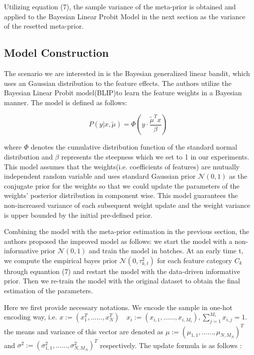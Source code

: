 \documentclass{article}
\begin{document}
Utilizing equation (7), the sample variance of the meta-prior is obtained and applied to the Bayesian Linear Probit Model in the next section as the variance of the resetted meta-prior.

\subsection{Model Construction}
The scenario we are interested in is the Bayesian generalized linear bandit, which uses an Gaussian distribution to the feature effects. The authors utilize the Bayesian Linear Probit model(BLIP)to learn the feature weights in a Bayesian manner. The model is defined as follows:

\begin{equation}
  P(y | x, \tilde{\mu} ) = \Phi (y \cdot \frac{\tilde{\mu}^T x}{\beta})
\end{equation}

where $\Phi$ denotes the cumulative distribution function of the standard normal distribution and $\beta$ represents the steepness which we set to 1 in our experiments. This model assumes that the weights(i.e. coefficients of features) are mutually independent random variable and uses standard Gaussian prior $\mathcal{N}(0,1)$ as the conjugate prior for the weights so that we could update the parameters of the weights' posterior distribution in component wise. This model guarantees the non-increased variance of each subsequent weight update and the weight variance is upper bounded by the initial pre-defined prior.

Combining the model with the meta-prior estimation in the previous section, the authors proposed the improved model as follows: we start the model with a non-informative prior $\mathcal{N}(0,1)$ and train the model in batches. At an early time t, we compute the empirical bayes prior $\mathcal{N}(0,\tau_{k,t}^2)$ for each feature category $C_k$ through equantion (7) and restart the model with the data-driven informative prior. Then we re-train the model with the original dataset to obtain the final estimation of the parameters.

Here we first provide necessary notations. We encode the sample in one-hot encoding way, i.e. $x := (x_1^T,......,x_N^T) \quad x_i := (x_{i,1},......,x_{i,M_i}), \sum_{j=1}^{M_i} x_{i,j} = 1$. the means and variance of this vector are denoted as ${\mu} := (\mu_{1,1},......,\mu_{N,M_N})^T$ and $\sigma^2 := (\sigma_{1,1}^2,......,\sigma_{N,M_N}^2)^T$ respectively.  The update formula is as follows \cite{BLIP1,PL}:
\end{document}
